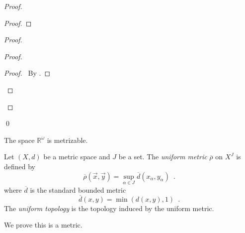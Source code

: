 \begin{proof}
\begin{proof}
  \end{proof}
  \begin{proof}
    \begin{proof}
      \qedstep
      \begin{proof}
        \pf\ By .
      \end{proof}
    \end{proof}
  \end{proof}
  \qed
\end{proof}

\begin{cor}
  The space $\mathbb{R}^\omega$ is metrizable.
\end{cor}

\begin{df}
  Let $(X, d)$ be a metric space and $J$ be a set. The \emph{uniform metric} $\overline{\rho}$ on
  $X^J$ is defined by
  \[ \overline{\rho}(\vec{x}, \vec{y}) = \sup_{\alpha \in J}
  \overline{d}(x_\alpha, y_\alpha) \enspace . \]
  where $\overline{d}$ is the standard bounded metric
  \[ \overline{d}(x, y) = \min(d(x, y), 1) \enspace . \]
  The \emph{uniform topology} is the topology induced by the uniform metric.

  We prove this is a metric.
\end{df}

